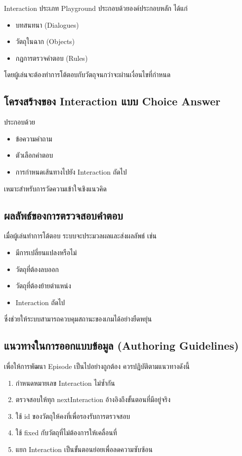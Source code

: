 Interaction ประเภท Playground ประกอบด้วยองค์ประกอบหลัก ได้แก่

\begin{itemize}
    \item บทสนทนา (Dialogues)
    \item วัตถุในฉาก (Objects)
    \item กฎการตรวจคำตอบ (Rules)
\end{itemize}

โดยผู้เล่นจะต้องทำการโต้ตอบกับวัตถุจนกว่าจะผ่านเงื่อนไขที่กำหนด

\subsection{โครงสร้างของ Interaction แบบ Choice Answer}

ประกอบด้วย

\begin{itemize}
    \item ข้อความคำถาม
    \item ตัวเลือกคำตอบ
    \item การกำหนดเส้นทางไปยัง Interaction ถัดไป
\end{itemize}

เหมาะสำหรับการวัดความเข้าใจเชิงแนวคิด

\subsection{ผลลัพธ์ของการตรวจสอบคำตอบ}

เมื่อผู้เล่นทำการโต้ตอบ ระบบจะประมวลผลและส่งผลลัพธ์ เช่น

\begin{itemize}
    \item มีการเปลี่ยนแปลงหรือไม่
    \item วัตถุที่ต้องลบออก
    \item วัตถุที่ต้องย้ายตำแหน่ง
    \item Interaction ถัดไป
\end{itemize}

ซึ่งช่วยให้ระบบสามารถควบคุมสถานะของเกมได้อย่างยืดหยุ่น

\subsection{แนวทางในการออกแบบข้อมูล (Authoring Guidelines)}

เพื่อให้การพัฒนา Episode เป็นไปอย่างถูกต้อง ควรปฏิบัติตามแนวทางดังนี้

\begin{enumerate}
    \item กำหนดหมายเลข Interaction ไม่ซ้ำกัน
    \item ตรวจสอบให้ทุก nextInteraction อ้างอิงถึงขั้นตอนที่มีอยู่จริง
    \item ใช้ id ของวัตถุให้คงที่เพื่อรองรับการตรวจสอบ
    \item ใช้ fixed กับวัตถุที่ไม่ต้องการให้เคลื่อนที่
    \item แยก Interaction เป็นขั้นตอนย่อยเพื่อลดความซับซ้อน
\end{enumerate}

